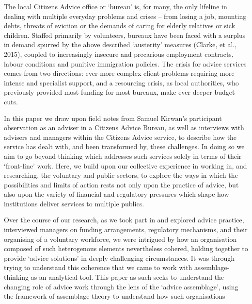 The local Citizens Advice office or ‘bureau’%
is, for many, the only lifeline in dealing with multiple everyday problems and crises – from losing a job, mounting debts, threats of eviction or the demands of caring for elderly relatives or sick children. Staffed primarily by volunteers, bureaux have been faced with a surplus in demand spurred by the above described ‘austerity’ measures (Clarke, et al., 2015), coupled to increasingly insecure and precarious employment contracts, labour conditions and punitive immigration policies. The crisis for advice services comes from two directions: ever-more complex client problems requiring more intense and specialist support, and a resourcing crisis, as local authorities, who previously provided most funding for most bureaux, make ever-deeper budget cuts.
\par
In this paper we draw upon field notes from Samuel Kirwan’s participant observation as an adviser in a Citizens Advice Bureau, as well as interviews with advisers and managers within the Citizens Advice service, to describe how the service has dealt with, and been transformed by, these challenges. In doing so we aim to go beyond thinking which addresses such services solely in terms of their ‘front-line’ work. Here, we build upon our collective experience in working in, and researching, the voluntary and public sectors, to explore the ways in which the possibilities and limits of action rests not only upon the practice of advice, but also upon the variety of financial and regulatory pressures which shape how institutions deliver services to multiple publics.
\par
Over the course of our research, as we took part in and explored advice practice, interviewed managers on funding arrangements, regulatory mechanisms, and their organising of a voluntary workforce, we were intrigued by how an organisation composed of such heterogenous elements nevertheless cohered, holding together to provide ‘advice solutions’ in deeply challenging circumstances. It was through trying to understand this coherence that we came to work with assemblage-thinking as an analytical tool. This paper as such seeks to understand the changing role of advice work through the lens of the ‘advice assemblage’, using the framework of assemblage theory to understand how such organisations%
